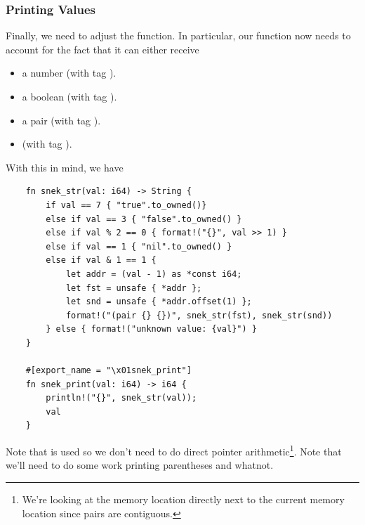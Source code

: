 \subsubsection{Printing Values}
Finally, we need to adjust the  function. In particular, our function now needs to account for the fact that it can either receive 
\begin{itemize}
    \item a number (with tag ).
    \item a boolean (with tag ).
    \item a pair (with tag ).
    \item {} (with tag ).
\end{itemize}
With this in mind, we have 
\begin{verbatim}
    fn snek_str(val: i64) -> String {
        if val == 7 { "true".to_owned()} 
        else if val == 3 { "false".to_owned() } 
        else if val % 2 == 0 { format!("{}", val >> 1) } 
        else if val == 1 { "nil".to_owned() } 
        else if val & 1 == 1 {
            let addr = (val - 1) as *const i64; 
            let fst = unsafe { *addr };
            let snd = unsafe { *addr.offset(1) };
            format!("(pair {} {})", snek_str(fst), snek_str(snd))
        } else { format!("unknown value: {val}") }
    }

    #[export_name = "\x01snek_print"]
    fn snek_print(val: i64) -> i64 {
        println!("{}", snek_str(val));
        val 
    }\end{verbatim}
Note that  is used so we don't need to do direct pointer arithmetic\footnote{We're looking at the memory location directly next to the current memory location since pairs are contiguous.}. Note that we'll need to do some work printing parentheses and whatnot.


